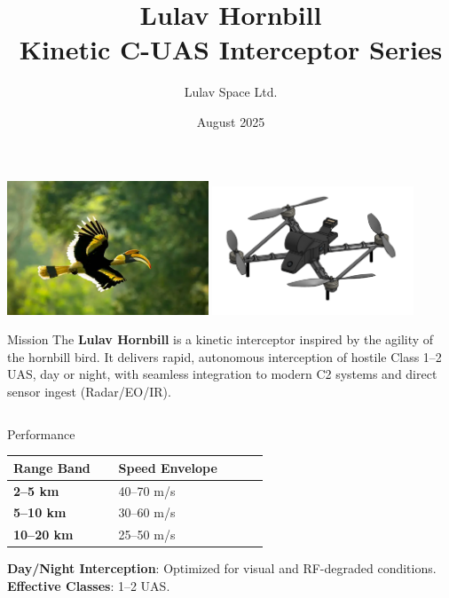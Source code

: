 \documentclass[english,final,hyperref={pdfpagelabels=false}]{beamer}
\title[]{\textbf{Lulav Hornbill}\\Kinetic C-UAS Interceptor Series}
\author[]{Lulav Space Ltd.}
\date[]{August 2025}
\begin{document}

\begin{frame}{ }

\begin{center}
\includegraphics[width=0.45\textwidth]{hornbill_image.png}
\hspace{2em}
\includegraphics[width=0.45\textwidth]{lulav_hornbill.png}
\end{center}

\vfill

\begin{block}{\Large Mission}
\large The \textbf{Lulav Hornbill} is a kinetic interceptor inspired by the agility of the hornbill bird. 
It delivers rapid, autonomous interception of hostile Class 1--2 UAS, day or night, with seamless integration to modern C2 systems and direct sensor ingest (Radar/EO/IR).
\end{block}

\begin{columns}[t]

\begin{block}{\Large Performance}
\begin{center}
\begin{tabular}{>{\bfseries}m{0.35\linewidth} m{0.5\linewidth}}
Range Band & Speed Envelope \\\midrule
2--5 km  & 40--70 m/s \\
5--10 km & 30--60 m/s \\
10--20 km & 25--50 m/s \\
\end{tabular}
\end{center}
\vspace{1ex}
\textbf{Day/Night Interception}: Optimized for visual and RF-degraded conditions.\\
\textbf{Effective Classes}: 1--2 UAS.
\end{block}


\end{columns}
\end{frame}
\end{document}
